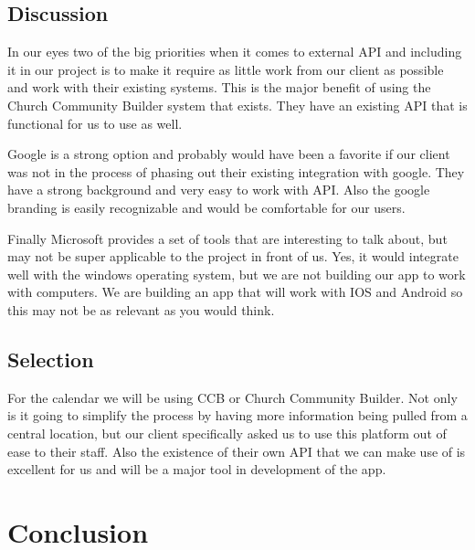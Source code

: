 \documentclass[letterpaper,10pt,draftclsnofoot,onecolumn,titlepage]{IEEEtran}
\begin{document}
	\subsection{Discussion}
	In our eyes two of the big priorities when it comes to external API and including it in our project is to make it require as little work from our client as possible and work with their existing systems. This is the major benefit of using the Church Community Builder system that exists. They have an existing API that is functional for us to use as well.

	Google is a strong option and probably would have been a favorite if our client was not in the process of phasing out their existing integration with google. They have a strong background and very easy to work with API. Also the google branding is easily recognizable and would be comfortable for our users.

	Finally Microsoft provides a set of tools that are interesting to talk about, but may not be super applicable to the project in front of us. Yes, it would integrate well with the windows operating system, but we are not building our app to work with computers. We are building an app that will work with IOS and Android so this may not be as relevant as you would think.
	\subsection{Selection}
	For the calendar we will be using CCB or Church Community Builder. Not only is it going to simplify the process by having more information being pulled from a central location, but our client specifically asked us to use this platform out of ease to their staff. Also the existence of their own API that we can make use of is excellent for us and will be a major tool in development of the app.
	\clearpage
	\section{Conclusion}

	
	
\end{document}
